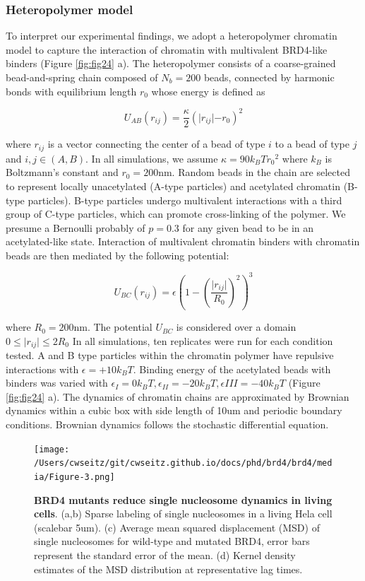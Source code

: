 \subsubsection{Heteropolymer model}

To interpret our experimental findings, we adopt a heteropolymer chromatin model to capture the interaction of chromatin with multivalent BRD4-like binders (Figure \ref{fig:fig24} a). The heteropolymer consists of a coarse-grained bead-and-spring chain composed of $N_b=200$ beads, connected by harmonic bonds with equilibrium length $r_0$ whose energy is deﬁned as

\begin{equation*}
U_{AB}(r_{ij})=\frac{\kappa}{2}(\lvert r_{ij}\lvert-r_0)^2
\end{equation*}

where $r_{ij}$ is a vector connecting the center of a bead of type $i$ to a bead of type $j$ and $i,j \in (A,B)$. In all simulations, we assume $\kappa=90k_{B}T{r_0}^2$ where $k_{B}$ is Boltzmann’s constant and $r_0=200$nm. Random beads in the chain are selected to represent locally unacetylated (A-type particles) and acetylated chromatin (B-type particles).  B-type particles undergo multivalent interactions with a third group of C-type particles, which can promote cross-linking of the polymer. We presume a Bernoulli probably of $p=0.3$ for any given bead to be in an acetylated-like state. Interaction of multivalent chromatin binders with chromatin beads are then mediated by the following potential:

\begin{equation*}
U_{BC}\left(r_{ij}\right)=\epsilon\left(1-\left(\frac{\lvert r_{ij}\lvert}{R_0}\right)^2\right)^3
\end{equation*}

where $R_0=200$nm. The potential $U_{BC}$ is considered over a domain $0\leq\lvert r_{ij}\lvert\leq 2 R_0$ In all simulations, ten replicates were run for each condition tested. A and B type particles within the chromatin polymer have repulsive interactions with $\epsilon = +10k_{B}T$. Binding energy of the acetylated beads with binders was varied with $\epsilon_{I} = 0 k_{B}T,\epsilon_{II} = -20k_{B}T,\epsilon{III}=-40k_{B}T$ (Figure \ref{fig:fig24} a). The dynamics of chromatin chains are approximated by Brownian dynamics within a cubic box with side length of 10um and periodic boundary conditions. Brownian dynamics follows the stochastic differential equation.

\begin{figure}[t]
\texttt{[image: /Users/cwseitz/git/cwseitz.github.io/docs/phd/brd4/brd4/media/Figure-3.png]}
\caption{\textbf{BRD4 mutants reduce single nucleosome dynamics in living cells}. (a,b) Sparse labeling of single nucleosomes in a living Hela cell (scalebar 5um). (c) Average mean squared displacement (MSD) of single nucleosomes for wild-type and mutated BRD4, error bars represent the standard error of the mean. (d) Kernel density estimates of the MSD distribution at representative lag times. }
\label{fig:fig26}
\end{figure}

